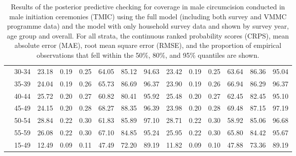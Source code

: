 \documentclass{article}
\begin{document}
\begin{appendix}
\begin{landscape}
{\begin{table}[H]
\begin{tabular}{ll ccc ccc ccc ccc}
    & 30-34 &  23.18 & 0.19 & 0.25 & 64.05 & 85.12 & 94.63 &  23.42 & 0.19 & 0.25 & 63.64 & 86.36 &  95.04 \\ 
    & 35-39 &  24.04 & 0.19 & 0.26 & 65.73 & 86.69 & 96.37 &  23.90 & 0.19 & 0.26 & 66.94 & 86.29 &  96.37 \\ 
    & 40-44 &  25.72 & 0.20 & 0.27 & 60.82 & 80.41 & 95.92 &  25.48 & 0.20 & 0.27 & 62.45 & 82.45 &  95.10 \\ 
    & 45-49 &  24.15 & 0.20 & 0.28 & 68.27 & 88.35 & 96.39 &  23.98 & 0.20 & 0.28 & 69.48 & 87.15 &  97.19 \\ 
    & 50-54 &  28.84 & 0.22 & 0.30 & 61.83 & 85.89 & 97.10 &  28.71 & 0.22 & 0.30 & 58.92 & 85.06 &  96.68 \\ 
    & 55-59 &  26.08 & 0.22 & 0.30 & 67.10 & 84.85 & 95.24 &  25.95 & 0.22 & 0.30 & 65.80 & 84.42 &  95.67 \\ 
    & 15-49 &  12.49 & 0.09 & 0.11 & 47.49 & 72.20 & 89.19 &  11.82 & 0.09 & 0.10 & 47.88 & 73.36 &  89.19 \\[5pt]
    \hline
    \end{tabular}
    \caption{Results of the posterior predictive checking for coverage in male circumcision conducted in male initiation ceremonies (TMIC) using the full model (including both survey and VMMC programme data) and the model with only household survey data and shown by survey year, age group and overall. For all strata, the continuous ranked probability scores (CRPS), mean absolute error (MAE), root mean square error (RMSE), and the proportion of empirical observations that fell within the 50\%, 80\%, and 95\% quantiles are shown.}
\end{table}}

\end{landscape}


\end{appendix}


\newpage 
\printbibliography

\end{document}
